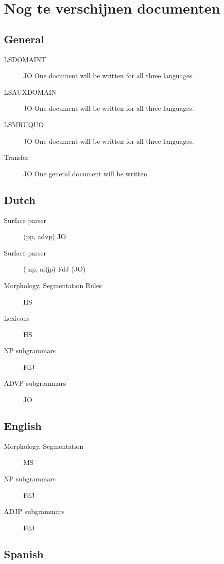 \newpage
\noindent
\normalsize
\section{Nog te verschijnen documenten}

\subsection{General}
\begin{description} 
  \item[LSDOMAINT] JO One document will be written for all three languages.
  \item[LSAUXDOMAIN] JO One document will be written for all three languages.
  \item[LSMRUQUO] JO One document will be written for all three languages.
  \item[Transfer] JO One general document will be written
\end{description}

\subsection{Dutch}
\begin{description}
  \item[Surface parser] (pp, advp) JO
  \item[Surface parser]( np, adjp) FdJ (JO)
  \item[Morphology, Segmentation Rules] HS
  \item[Lexicons] HS
  \item[NP subgrammars] FdJ 
  \item[ADVP  subgrammars] JO
\end{description}

\subsection{English}

\begin{description}
  \item[Morphology, Segmentation] MS
  \item[NP subgrammars] FdJ
  \item[ADJP subgrammars] FdJ
\end{description}

\subsection{Spanish}

